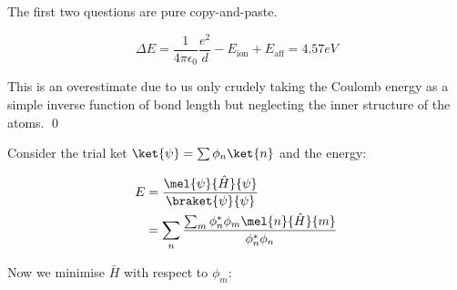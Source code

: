 \documentclass[12pt]{article}
\begin{document}



\pagebreak
\section*{}




The first two questions are pure copy-and-paste.

\begin{equation}
    \Delta E = \frac{1}{4\pi \epsilon_{0}} \frac{e^{2}}{d} - E_{\text{ion}} + E_{\text{aff}} = 4.57 eV
\end{equation}

This is an overestimate due to us only crudely taking the Coulomb energy as a simple inverse function of bond length but neglecting the inner structure of the atoms.
\qed




Consider the trial ket $\ket{\psi} = \sum \phi_{n} \ket{n}$ and the energy:

\begin{equation}
    \begin{split}
        E &= \frac{\mel{\psi}{\hat{H}}{\psi}}{\braket{\psi}{\psi}} \\
        &= \sum_{n} \frac{\sum_{m} \phi_{n}^{*} \phi_{m} \mel{n}{\hat{H}}{m}}{\phi_{n}^{*} \phi_{n}}
    \end{split}
\end{equation}

Now we minimise $\bar{H}$ with respect to $\phi_{m}$:
\end{document}

